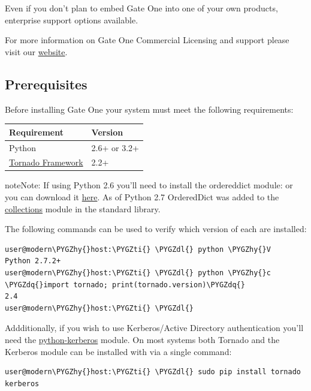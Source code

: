 \documentclass[letterpaper,10pt,openany]{sphinxmanual}
\def\PYGZdl{\char`\$}
\def\PYGZhy{\char`\-}
\def\PYGZdq{\char`\"}
\def\PYGZti{\char`\~}
\begin{document}
Even if you don't plan to embed Gate One into one of your own products, enterprise support options available.

For more information on Gate One Commercial Licensing and support please visit our \href{http://liftoffsoftware.com}{website}.


\subsection{Prerequisites}
\label{About/prerequisites:prerequisites}\label{About/prerequisites::doc}
Before installing Gate One your system must meet the following requirements:

\begin{tabulary}{\linewidth}{|L|L|}
\hline
\textsf{\relax 
Requirement
} & \textsf{\relax 
Version
}\\
\hline
Python
 & 
2.6+ or 3.2+
\\
\hline
\href{http://www.tornadoweb.org/}{Tornado Framework}
 & 
2.2+
\\
\hline\end{tabulary}


\begin{notice}{note}{Note:}
If using Python 2.6 you'll need to install the ordereddict module:   or you can download it \href{http://pypi.python.org/pypi/ordereddict}{here}.  As of Python 2.7 OrderedDict was added to the \href{http://docs.python.org/library/collections.html}{collections} module in the standard library.
\end{notice}

The following commands can be used to verify which version of each are installed:

\begin{Verbatim}[commandchars=\\\{\}]
user@modern\PYGZhy{}host:\PYGZti{} \PYGZdl{} python \PYGZhy{}V
Python 2.7.2+
user@modern\PYGZhy{}host:\PYGZti{} \PYGZdl{} python \PYGZhy{}c \PYGZdq{}import tornado; print(tornado.version)\PYGZdq{}
2.4
user@modern\PYGZhy{}host:\PYGZti{} \PYGZdl{}
\end{Verbatim}

Addditionally, if you wish to use Kerberos/Active Directory authentication you'll need the \href{http://pypi.python.org/pypi/kerberos}{python-kerberos} module.  On most systems both Tornado and the Kerberos module can be installed with via a single command:

\begin{Verbatim}[commandchars=\\\{\}]
user@modern\PYGZhy{}host:\PYGZti{} \PYGZdl{} sudo pip install tornado kerberos
\end{Verbatim}
\end{document}
